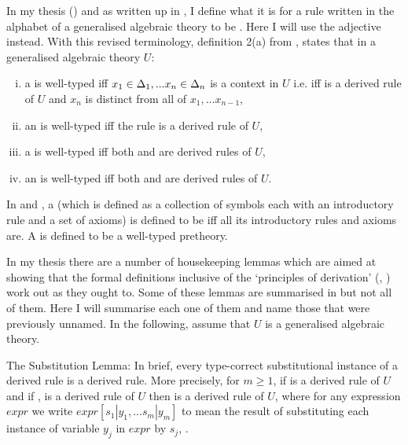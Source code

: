 \label{generalisedalgrbraictheories}
In my thesis (\cite{Cartmell78}) and as written up in \cite{Cartmell86}, I define what it is for a rule written in the alphabet of a generalised algebraic theory to be . Here I will use the adjective  instead.
With this revised terminology, definition 2(a) from \cite{Cartmell86}, states that in  a generalised algebraic theory $U$:
\begin{enumerate} [(i)]
\item 
a \Trule {} is well-typed  iff 
$x_1 \in \Delta_1,... x_{n} \in \Delta_{n}$ is a context in $U$ i.e. iff 
 is a derived rule of $U$ and $x_n$ is distinct from all of $x_1,...x_{n-1}$, 
\item 
an \trule {} is well-typed iff
the rule  is a derived rule of $U$,
\item 
a \Teqrule {} is well-typed iff
both  and  are derived rules
of $U$,
\item 
an \teqrule {} is well-typed iff
both  and  are derived rules
of $U$.
\end{enumerate}
In \cite{Cartmell78} and \cite{Cartmell86}, a  (which is defined as a collection of symbols each with an introductory rule and a set of axioms) is defined to be  iff all its introductory rules and axioms are. A  is defined to be a well-typed pretheory.

\note In my thesis there are a number of housekeeping lemmas which are aimed at showing that the formal definitions inclusive of the `principles of derivation' (\cite{Cartmell78}, \cite{Cartmell86}) work out as they ought to. Some of these lemmas are summarised in \cite{Cartmell86} but not all of them. Here I will summarise each one of them and name those that were previously unnamed. In the following, assume that $U$ is a generalised algebraic theory.

\note The Substitution Lemma: In brief, every type-correct substitutional instance of a derived rule is a derived rule. More precisely, for $m \geq 1$, if  is a derived rule of $U$ 
and if  \foreachj,  is a derived rule of $U$
then  is a derived rule of $U$, where
for any expression $expr$ we write
$expr[s_1|y_1,...s_m|y_m]$ to mean
the result of substituting each instance of variable $y_j$ in $expr$ by $s_j$, \foreachj.

